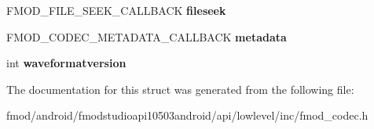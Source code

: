\begin{DoxyCompactItemize}
\item 
\hypertarget{struct_f_m_o_d___c_o_d_e_c___s_t_a_t_e_a3c814d627ae700dbd21bd626d663f73e}{F\+M\+O\+D\+\_\+\+F\+I\+L\+E\+\_\+\+S\+E\+E\+K\+\_\+\+C\+A\+L\+L\+B\+A\+C\+K {\bfseries fileseek}}\label{struct_f_m_o_d___c_o_d_e_c___s_t_a_t_e_a3c814d627ae700dbd21bd626d663f73e}

\item 
\hypertarget{struct_f_m_o_d___c_o_d_e_c___s_t_a_t_e_a0724fc5682690a32814d3301aef59810}{F\+M\+O\+D\+\_\+\+C\+O\+D\+E\+C\+\_\+\+M\+E\+T\+A\+D\+A\+T\+A\+\_\+\+C\+A\+L\+L\+B\+A\+C\+K {\bfseries metadata}}\label{struct_f_m_o_d___c_o_d_e_c___s_t_a_t_e_a0724fc5682690a32814d3301aef59810}

\item 
\hypertarget{struct_f_m_o_d___c_o_d_e_c___s_t_a_t_e_aaabe04329018e5e8d98c7a15c523df8b}{int {\bfseries waveformatversion}}\label{struct_f_m_o_d___c_o_d_e_c___s_t_a_t_e_aaabe04329018e5e8d98c7a15c523df8b}

\end{DoxyCompactItemize}


The documentation for this struct was generated from the following file\+:\begin{DoxyCompactItemize}
\item 
fmod/android/fmodstudioapi10503android/api/lowlevel/inc/fmod\+\_\+codec.\+h\end{DoxyCompactItemize}

